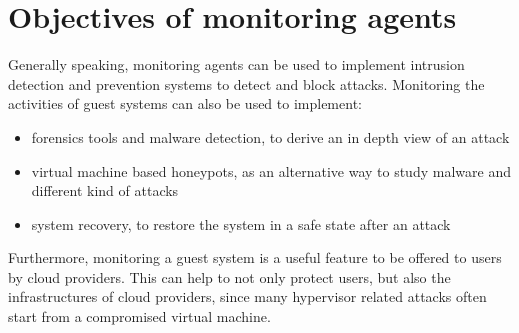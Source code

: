 \section{Objectives of monitoring agents}
Generally speaking, monitoring agents can be used to implement intrusion detection and prevention systems to detect and block attacks. Monitoring the activities of guest systems can also be used to implement:
\begin{itemize}
    \item forensics tools and malware detection, to derive an in depth view of an attack
    \item virtual machine based honeypots, as an alternative way to study malware and different kind of attacks
    \item system recovery, to restore the system in a safe state after an attack
\end{itemize}
Furthermore, monitoring a guest system is a useful feature to be offered to users by cloud providers. This can help to not only protect users, but also the infrastructures of cloud providers, since many hypervisor related attacks often start from a compromised virtual machine. 

